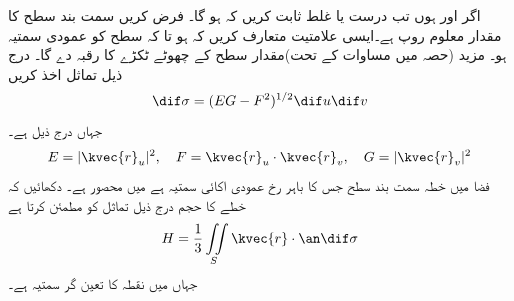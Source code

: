 اگر   اور  ہوں تب  درست یا غلط ثابت کریں کہ  ہو گا۔
فرض کریں سمت بند سطح کا  مقدار معلوم روپ   ہے۔ایسی علامتیت متعارف کریں کہ  ہو تا کہ   سطح کو   عمودی سمتیہ ہو۔ مزید (حصہ   میں مساوات   کے تحت)مقدار    سطح کے چھوٹے ٹکڑے کا رقبہ دے گا۔ درج ذیل تماثل اخذ کریں
\[\dif\sigma=(EG-F^2)^{1/2}\dif u\dif v\]
جہاں درج ذیل ہے۔
\[E=|\kvec{r}_u|^2,\quad F=\kvec{r}_u\cdot\kvec{r}_v,\quad G=|\kvec{r}_v|^2\]
 فضا میں    خطہ سمت بند سطح   جس  کا باہر رخ عمودی اکائی سمتیہ  ہے میں محصور ہے۔ دکھائیں کہ خطے کا حجم  درج ذیل تماثل کو مطمئن کرتا ہے
\[H=\frac{1}{3}\iint\limits_S\kvec{r}\cdot\an\dif\sigma\]
جہاں  میں نقطہ  کا تعین گر سمتیہ  ہے۔

